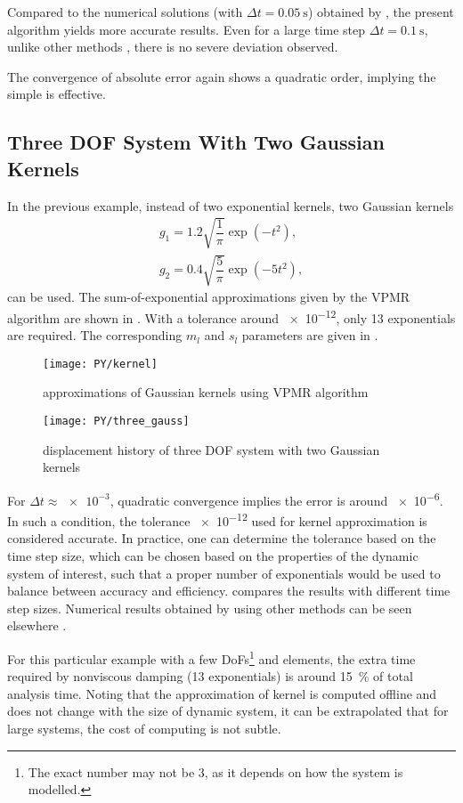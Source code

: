 Compared to the numerical solutions (with $\Delta{}t=\SI{0.05}{\second}$) obtained by \citet{Cortes2009}, the present algorithm yields more accurate results. Even for a large time step $\Delta{}t=\SI{0.1}{\second}$, unlike other methods \citep{Liu2023}, there is no severe deviation observed.

The convergence of absolute error again shows a quadratic order, implying the simple  is effective.

\subsection{Three DOF System With Two Gaussian Kernels}
In the previous example, instead of two exponential kernels, two Gaussian kernels
\begin{gather}
g_1=1.2\sqrt{\dfrac{1}{\pi}}\exp\left(-t^2\right),\\
g_2=0.4\sqrt{\dfrac{5}{\pi}}\exp\left(-5t^2\right),
\end{gather}
can be used. The sum-of-exponential approximations given by the VPMR algorithm are shown in . With a tolerance around \num{e-12}, only \num{13} exponentials are required. The corresponding $m_l$ and $s_l$ parameters are given in .
\begin{figure}[H]
\centering
\texttt{[image: PY/kernel]}
\caption{approximations of Gaussian kernels using VPMR algorithm}\label{fig:vpmr}
\end{figure}

\begin{figure}[H]
\centering
\texttt{[image: PY/three\_gauss]}
\caption{displacement history of three DOF system with two Gaussian kernels}\label{fig:three_gauss}
\end{figure}
For $\Delta{}t\approx\num{e-3}$, quadratic convergence implies the error is around \num{e-6}. In such a condition, the tolerance \num{e-12} used for kernel approximation is considered accurate. In practice, one can determine the tolerance based on the time step size, which can be chosen based on the properties of the dynamic system of interest, such that a proper number of exponentials would be used to balance between accuracy and efficiency.  compares the results with different time step sizes. Numerical results obtained by using other methods can be seen elsewhere \citep{Shen2021}.

For this particular example with a few DoFs\footnote{The exact number may not be \num{3}, as it depends on how the system is modelled.} and elements, the extra time required by nonviscous damping (\num{13} exponentials) is around \SI{15}{\percent} of total analysis time. Noting that the approximation of kernel is computed offline and does not change with the size of dynamic system, it can be extrapolated that for large systems, the cost of computing  is not subtle.
